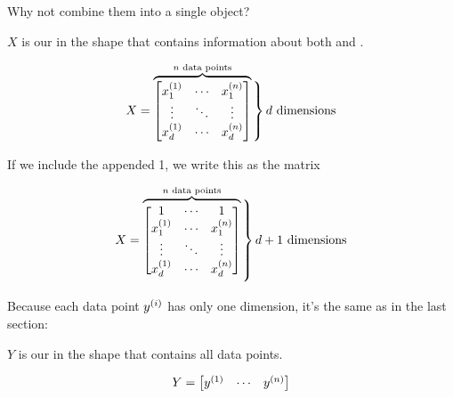         Why not combine them into a single object?\\
        
        \begin{kequation}
            $X$ is our  in the shape  that contains information about both  and .
            
            \begin{equation}
                X = 
                    \overbrace{
                        \begin{bmatrix}
                            \ex{x_1}{1} & \cdots  & \ex{x_1}{n} \\
                            \vdots      & \ddots & \vdots      \\
                            \ex{x_d}{1} & \cdots  & \ex{x_d}{n}
                        \end{bmatrix}
                        }^{ n \text{ data points}}
                    \bigggrB{50pt} d \text{ dimensions}
            \end{equation}

        \end{kequation}
        
        If we include the appended 1, we write this as the  matrix
        
        \begin{equation}
                X = 
                    \overbrace{
                        \begin{bmatrix}
                            1           & \cdots & 1           \\
                            \ex{x_1}{1} & \cdots  & \ex{x_1}{n} \\
                            \vdots      & \ddots & \vdots      \\
                            \ex{x_d}{1} & \cdots  & \ex{x_d}{n}
                        \end{bmatrix}
                        }^{ n \text{ data points}}
                    \bigggrB{70pt} d+1 \text{ dimensions}
        \end{equation}
        
        Because each data point $y^{(i)}$ has only one dimension, it's the same as in the last section:\\
        
        \begin{kequation}
            $Y$ is our  in the shape  that contains all data points.
            
            \begin{equation*}
                Y = 
                    \begin{bmatrix}
                        y^{(1)} & \cdots & y^{(n)}
                    \end{bmatrix}
            \end{equation*}
        \end{kequation}
        
